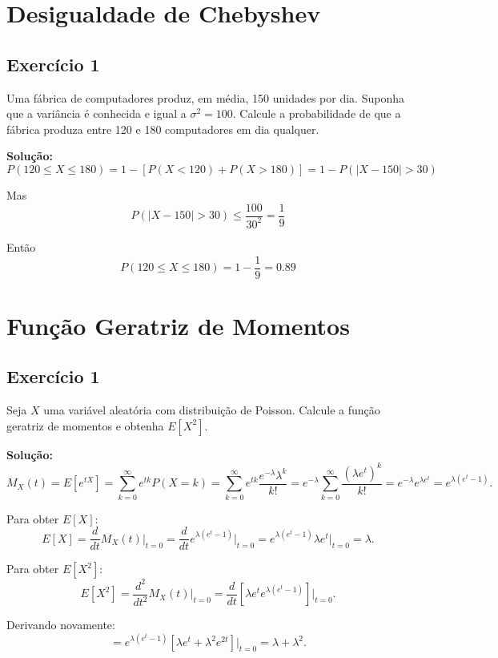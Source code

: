\documentclass{article}
\begin{document}
\section{Desigualdade de Chebyshev}
\subsection{Exercício 1}
Uma fábrica de computadores produz, em média, 150 unidades por dia. Suponha que a variância é conhecida e igual a $\sigma^2 = 100$. Calcule a probabilidade de que a fábrica produza entre 120 e 180 computadores em dia qualquer.

\vspace{0.5cm}
\textbf{Solução:} 
    $$
    P(120 \leq X \leq 180) 
    = 1 - [P(X < 120) + P(X > 180)] 
    = 1 - P(|X - 150| > 30)
    $$

Mas
    $$
    P(|X - 150| > 30) \leq \frac{100}{30^2} = \frac{1}{9}
    $$

Então
    $$
    P(120 \leq X \leq 180) 
    = 1 - \frac{1}{9} = 0.89
    $$

\section{Função Geratriz de Momentos}
\subsection{Exercício 1}
Seja $X$ uma variável aleatória com distribuição de Poisson. Calcule a função geratriz de momentos e obtenha $E[X^2]$.

\vspace{0.5cm}
\textbf{Solução:} 
    $$
    M_X(t) = E[e^{tX}] = \sum_{k=0}^{\infty} e^{tk} P(X=k) = \sum_{k=0}^{\infty} e^{tk} \frac{e^{-\lambda} \lambda^k}{k!} 
    = e^{-\lambda} \sum_{k=0}^{\infty} \frac{(\lambda e^t)^k}{k!} 
    = e^{-\lambda} e^{\lambda e^t} 
    = e^{\lambda (e^t - 1)}.
    $$

Para obter $E[X]$:
    $$
    E[X] = \frac{d}{dt} M_X(t) \bigg|_{t=0} 
    = \frac{d}{dt} e^{\lambda (e^t - 1)} \bigg|_{t=0} 
    = e^{\lambda (e^t - 1)} \lambda e^t \bigg|_{t=0} 
    = \lambda.
    $$

Para obter $E[X^2]$:
    $$
    E[X^2] = \frac{d^2}{dt^2} M_X(t) \bigg|_{t=0}
    = \frac{d}{dt} \left[ \lambda e^t e^{\lambda (e^t - 1)} \right] \bigg|_{t=0}.
    $$

Derivando novamente:
    $$
    = e^{\lambda (e^t - 1)} 
    \left[
    \lambda e^t + \lambda^2 e^{2t}
    \right] 
    \bigg|_{t=0}
    = \lambda + \lambda^2.
    $$
\end{document}
